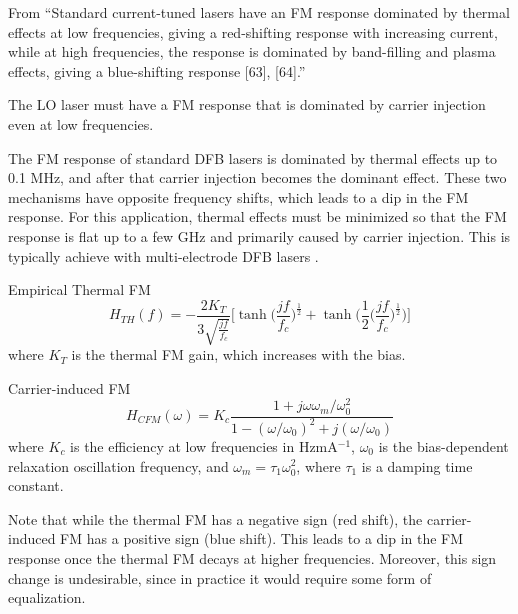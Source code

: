 \documentclass[a4paper]{article}
\begin{document}
From \cite{Langley1999}
``Standard current-tuned lasers have an FM response dominated by thermal effects at low frequencies, giving a red-shifting response with increasing current, while at high frequencies, the response is dominated by band-filling and plasma effects, giving a blue-shifting response [63], [64].''

The LO laser must have a FM response that is dominated by carrier injection even at low frequencies. 

The FM response of standard DFB lasers is dominated by thermal effects up to 0.1 MHz, and after that carrier injection becomes the dominant effect. These two mechanisms have opposite frequency shifts, which leads to a dip in the FM response. For this application, thermal effects must be minimized so that the FM response is flat up to a few GHz and primarily caused by carrier injection. This is typically achieve with multi-electrode DFB lasers .

\cite{Dilwali1992}
Empirical Thermal FM
\begin{equation}
H_{TH}(f) = -\frac{2K_T}{3\sqrt{\frac{jf}{f_c}}}\Big[\tanh\Big(\frac{jf}{f_c}\Big)^{\frac{1}{2}} + \tanh\Big(\frac{1}{2}\Big(\frac{jf}{f_c}\Big)^\frac{1}{2}\Big)\Big]
\end{equation}
where $K_T$ is the thermal FM gain, which increases with the bias.

Carrier-induced FM
\begin{equation}
H_{CFM}(\omega) = K_c\frac{1 + j\omega\omega_m/\omega_0^2}{1 - (\omega/\omega_0)^2 + j(\omega/\omega_0)}
\end{equation}
where $K_c$ is the efficiency at low frequencies in HzmA$^{-1}$, $\omega_0$ is the bias-dependent relaxation oscillation frequency, and $\omega_m = \tau_1\omega_0^2$, where $\tau_1$ is a damping time constant.

Note that while the thermal FM has a negative sign (red shift), the carrier-induced FM has a positive sign (blue shift). This leads to a dip in the FM response once the thermal FM decays at higher frequencies. Moreover, this sign change is undesirable, since in practice it would require some form of equalization.






\end{document}
